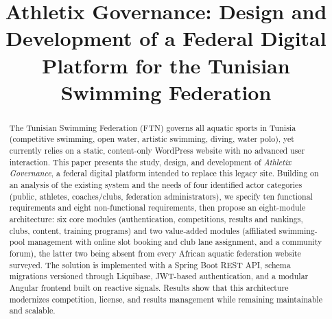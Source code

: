\documentclass[conference]{IEEEtran}
\begin{document}
\title{Athletix Governance: Design and Development of a Federal Digital Platform for the Tunisian Swimming Federation}

\author{
\and
{}
\and
{}
\and
{}
\and
{}
}

\maketitle

\begin{abstract}
The Tunisian Swimming Federation (FTN) governs all aquatic sports in Tunisia (competitive swimming, open water, artistic swimming, diving, water polo), yet currently relies on a static, content-only WordPress website with no advanced user interaction. This paper presents the study, design, and development of \emph{Athletix Governance}, a federal digital platform intended to replace this legacy site. Building on an analysis of the existing system and the needs of four identified actor categories (public, athletes, coaches/clubs, federation administrators), we specify ten functional requirements and eight non-functional requirements, then propose an eight-module architecture: six core modules (authentication, competitions, results and rankings, clubs, content, training programs) and two value-added modules (affiliated swimming-pool management with online slot booking and club lane assignment, and a community forum), the latter two being absent from every African aquatic federation website surveyed. The solution is implemented with a Spring Boot REST API, schema migrations versioned through Liquibase, JWT-based authentication, and a modular Angular frontend built on reactive signals. Results show that this architecture modernizes competition, license, and results management while remaining maintainable and scalable.
\end{abstract}
\end{document}
